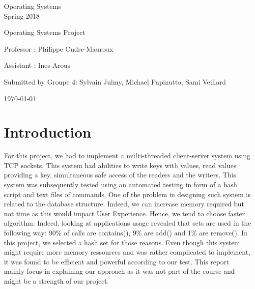 \documentclass[a4paper,11pt]{report}
\begin{document}
    \begin{center}
        \Large{
            Operating Systems\\
            Spring 2018
        }

        \noindent\makebox[\linewidth]{\rule{\linewidth}{0.4pt}}
        Operating Systems Project
        \noindent\makebox[\linewidth]{\rule{\linewidth}{0.4pt}}

        \begin{flushleft}
            Professor : Philippe Cudre-Mauroux

            Assistant : Ines Arous
        \end{flushleft}

        \noindent\makebox[\linewidth]{\rule{\linewidth}{0.4pt}}

        Submitted by Groupe 4: Sylvain Julmy, Michael Papinutto, Sami Veillard

        \noindent\makebox[\linewidth]{\rule{\textwidth}{1pt}}
        \vspace*{0.8cm}
        \today

    \end{center}

    \newpage

    \section*{Introduction}
    For this project, we had to implement a multi-threaded client-server system using TCP sockets.
    This system had abilities to write keys with values, read values providing a key, simultaneous safe access of the
    readers and the writers.
    This system was subsequently tested using an automated testing in form of a bash script and text files of commands.
    One of the problem in designing such system is related to the database structure.
    Indeed, we can increase memory required but not time as this would impact User Experience.
    Hence, we tend to choose faster algorithm.
    Indeed, looking at applications usage revealed that sets are used in the following way: 90\% of calls are contains(),
    9\% are add() and 1\% are remove(). In this project, we selected a hash set for those reasons.
    Even though this system might require more memory ressources and was rather complicated to implement, it was found to
    be efficient and powerful according to our test.
    This report mainly focus in explaining our approach as it was not part of the course and might be a strength of
    our project.
\end{document}
